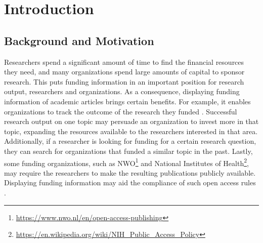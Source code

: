 \documentclass{report}
\theoremstyle{definition}
\theoremstyle{remark}
\begin{document}
\begin{abstract}
Automatic extraction of funding information from academic articles adds significant value to industry and research communities, such as tracking research outcome by funding organizations and aiding open access rules. An important part of funding information extraction is detecting mentions of grant numbers and funding organizations, and mapping them to their corresponding entities in a knowledge base. For this purpose, various approaches have been proposed. In this thesis, we investigate general-purpose neural architectures for Named Entity Recognition and Disambiguation, and adapt them to the problem of Entity Linking in funding domain. A neural language model (BERT) is pretrained with sentences that contain funding information and is used in the proposed neural solutions. The developed approaches are compared with strong feature-based models, showing improvement on mention detection and end-to-end Entity Linking. At the end, precision, recall and F1 scores of 72.9, 79.0 and 75.8 are reached for Entity Linking for funding organizations, and scores of 94, 96.6 and 95.2 for grant mention detection using the developed neural approaches. 
\end{abstract}



\tableofcontents


\chapter{Introduction}
\label{sec:intro}
\section{Background and Motivation}



Researchers spend a significant amount of time to find the financial resources they need, and many organizations spend large amounts of capital to sponsor research. This puts funding information in an important position for research output, researchers and organizations. As a consequence, displaying funding information of academic articles brings certain benefits. For example, it enables organizations to track the outcome of the research they funded \cite{ElsPaper}. Successful research output on one topic may persuade an organization to invest more in that topic, expanding the resources available to the researchers interested in that area. Additionally, if a researcher is looking for funding for a certain research question, they can search for organizations that funded a similar topic in the past. Lastly, some funding organizations, such as NWO\footnote{\url{https://www.nwo.nl/en/open-access-publishing}} and National Institutes of Health\footnote{\url{https://en.wikipedia.org/wiki/NIH_Public_Access_Policy}},  may require the researchers to make the resulting publications publicly available. Displaying funding information may aid the compliance of such open access rules \cite{GrantExtractor}. 
\end{document}
